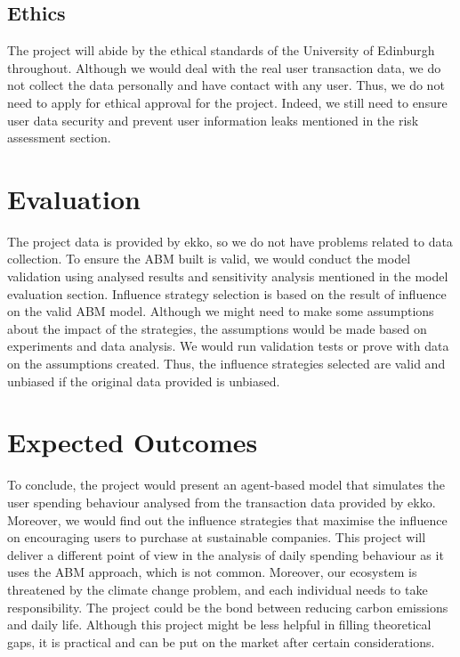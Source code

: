 \documentclass[a4paper,11pt]{article}
\begin{document}
\subsection{Ethics}
The project will abide by the ethical standards of the University of Edinburgh throughout.
Although we would deal with the real user transaction data, we do not collect the data personally and have contact with any user. Thus, we do not need to apply for ethical approval for the project. Indeed, we still need to ensure user data security and prevent user information leaks mentioned in the risk assessment section.

\section{Evaluation}

The project data is provided by ekko, so we do not have problems related to data collection. To ensure the ABM built is valid, we would conduct the model validation using analysed results and sensitivity analysis mentioned in the model evaluation section. Influence strategy selection is based on the result of influence on the valid ABM model. Although we might need to make some assumptions about the impact of the strategies, the assumptions would be made based on experiments and data analysis. We would run validation tests or prove with data on the assumptions created.
Thus, the influence strategies selected are valid and unbiased if the original data provided is unbiased.

\section{Expected Outcomes}

To conclude, the project would present an agent-based model that simulates the user spending behaviour analysed from the transaction data provided by ekko. Moreover, we would find out the influence strategies that maximise the influence on encouraging users to purchase at sustainable companies.
This project will deliver a different point of view in the analysis of daily spending behaviour as it uses the ABM approach, which is not common. Moreover, our ecosystem is threatened by the climate change problem, and each individual needs to take responsibility. The project could be the bond between reducing carbon emissions and daily life. Although this project might be less helpful in filling theoretical gaps, it is practical and can be put on the market after certain considerations.
\end{document}
